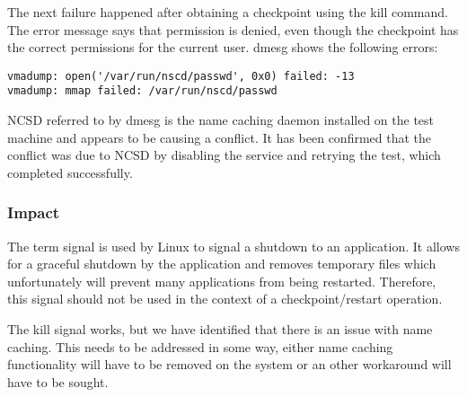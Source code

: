 The next failure happened after obtaining a checkpoint using the kill command. The error message says that permission is denied, even though the checkpoint has the correct permissions for the current user. dmesg shows the following errors:
\begin{lstlisting}
vmadump: open('/var/run/nscd/passwd', 0x0) failed: -13
vmadump: mmap failed: /var/run/nscd/passwd
\end{lstlisting}
NCSD referred to by dmesg is the name caching daemon installed on the test machine and appears to be causing a conflict. It has been confirmed that the conflict was due to NCSD by disabling the service and retrying the test, which completed successfully.



\subsubsection{Impact}
The term signal is used by Linux to signal a shutdown to an application. It allows for a graceful shutdown by the application and removes temporary files which unfortunately will prevent many applications from being restarted. Therefore, this signal should not be used in the context of a checkpoint/restart operation.

The kill signal works, but we have identified that there is an issue with name caching. This needs to be addressed in some way, either name caching functionality will have to be removed on the system or an other workaround will have to be sought.



